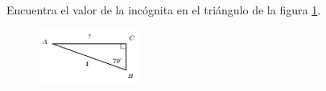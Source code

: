 Encuentra el valor de la incógnita en el triángulo de la figura \ref{fig:lados_functrig_02}.
\begin{figure}[H]
    \begin{center}
        \includegraphics[width=0.3\textwidth]{../images/lados_functrig_02.png}
    \end{center}
    \caption{}
    \label{fig:lados_functrig_02}
\end{figure}